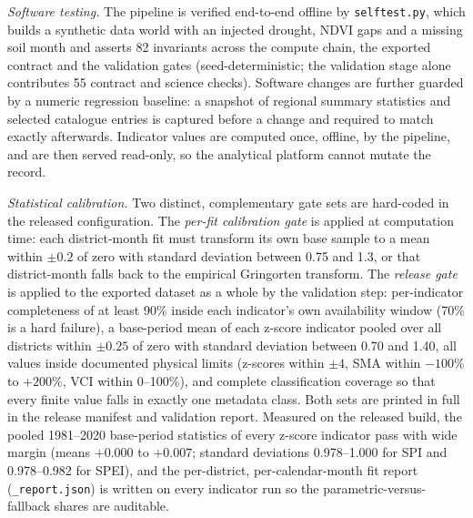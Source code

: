 \documentclass[10pt,a4paper]{article}
\begin{document}
\emph{Software testing.} The pipeline is verified end-to-end offline by \texttt{selftest.py}, which builds a synthetic data world with an injected drought, NDVI gaps and a missing soil month and asserts 82 invariants across the compute chain, the exported contract and the validation gates (seed-deterministic; the validation stage alone contributes 55 contract and science checks). Software changes are further guarded by a numeric regression baseline: a snapshot of regional summary statistics and selected catalogue entries is captured before a change and required to match exactly afterwards. Indicator values are computed once, offline, by the pipeline, and are then served read-only, so the analytical platform cannot mutate the record.

\emph{Statistical calibration.} Two distinct, complementary gate sets are hard-coded in the released configuration. The \emph{per-fit calibration gate} is applied at computation time: each district-month fit must transform its own base sample to a mean within $\pm0.2$ of zero with standard deviation between 0.75 and 1.3, or that district-month falls back to the empirical Gringorten transform. The \emph{release gate} is applied to the exported dataset as a whole by the validation step: per-indicator completeness of at least 90\% inside each indicator's own availability window (70\% is a hard failure), a base-period mean of each z-score indicator pooled over all districts within $\pm0.25$ of zero with standard deviation between 0.70 and 1.40, all values inside documented physical limits (z-scores within $\pm4$, SMA within $-100$\% to $+200$\%, VCI within 0--100\%), and complete classification coverage so that every finite value falls in exactly one metadata class. Both sets are printed in full in the release manifest and validation report. Measured on the released build, the pooled 1981--2020 base-period statistics of every z-score indicator pass with wide margin (means $+0.000$ to $+0.007$; standard deviations 0.978--1.000 for SPI and 0.978--0.982 for SPEI), and the per-district, per-calendar-month fit report (\texttt{\_report.json}) is written on every indicator run so the parametric-versus-fallback shares are auditable.
\end{document}

